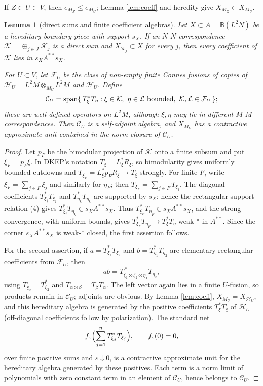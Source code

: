\documentclass[12pt]{article}
\newtheorem{lemma}{Lemma}
\newcommand{\cH}{\mathcal H}
\newcommand{\cK}{\mathcal K}
\newcommand{\cL}{\mathcal L}
\newcommand{\cF}{\mathcal F}
\begin{document}
If \(Z\subset U\subset V\), then \(e_{M_Z}\le e_{M_U}\); Lemma
\ref{lem:coeff} and heredity give \(X_{M_Z}\subset X_{M_U}\).

\begin{lemma}[direct sums and finite coefficient algebras]\label{lem:dsupport}
Let \(X\subset A=\mathbb B(L^2N)\) be a hereditary boundary piece with support
\(s_X\).  If an \(N\)-\(N\) correspondence \(\cK=\oplus_{j\in J}\cK_j\) is a
direct sum and \(X_{\cK_j}\subset X\) for every \(j\), then every coefficient of
\(\cK\) lies in \(s_XA^{**}s_X\).

For \(U\subset V\), let \(\cF_U\) be the class of non-empty finite Connes
fusions of copies of
\(\cH_U=L^2M\otimes_{M_U}L^2M\) and \(\overline{\cH_U}\).  Define
\[
 \mathcal C_U=\operatorname{span}\{\,T_\xi^*T_\eta:
       \xi\in\cK,\ \eta\in\cL \hbox{ bounded},\ \cK,\cL\in\cF_U\,\};
\]
these are well-defined operators on \(L^2M\), although \(\xi,\eta\) may lie in
different \(M\)-\(M\) correspondences.  Then \(\mathcal C_U\) is a self-adjoint
algebra, and \(X_{M_U}\) has a contractive approximate unit contained in the
norm closure of \(\mathcal C_U\).
\end{lemma}

\begin{proof}
Let \(p_F\) be the bimodular projection of \(\cK\) onto a finite subsum and put
\(\xi_F=p_F\xi\).  In DKEP's notation \(T_\xi=L_\xi^*R_\xi\), so bimodularity
gives uniformly bounded cutdowns and
\(T_{\xi_F}=L_\xi^*p_FR_\xi\to T_\xi\) strongly.  For finite \(F\), write
\(\xi_F=\sum_{j\in F}\xi_j\) and similarly for \(\eta_F\); then
\(T_{\xi_F}=\sum_{j\in F}T_{\xi_j}\).  The diagonal coefficients
\(T_{\xi_j}^*T_{\xi_j}\) and
\(T_{\eta_k}^*T_{\eta_k}\) are supported by \(s_X\); hence the rectangular
support relation (4) gives \(T_{\xi_j}^*T_{\eta_k}\in s_XA^{**}s_X\).  Thus
\(T_{\xi_F}^*T_{\eta_F}\in s_XA^{**}s_X\), and the strong convergence, with uniform bounds, gives
\(T_{\xi_F}^*T_{\eta_F}\to T_\xi^*T_\eta\) weak-* in \(A^{**}\).  Since the corner
\(s_XA^{**}s_X\) is weak-* closed, the first assertion follows.

For the second assertion, if
\(a=T_{\xi_1}^*T_{\xi_2}\) and \(b=T_{\eta_1}^*T_{\eta_2}\) are elementary
rectangular coefficients from \(\cF_U\), then
\[
 ab=T_{\xi_1\otimes\overline{\xi_2}\otimes\eta_1}^{\,*}T_{\eta_2},
\]
using \(T_{\overline{\xi_2}}=T_{\xi_2}^*\) and
\(T_{\alpha\otimes\beta}=T_\beta T_\alpha\).  The left vector again lies in a
finite \(U\)-fusion, so products remain in \(\mathcal C_U\); adjoints are
obvious.  By Lemma \ref{lem:coeff}, \(X_{M_U}=X_{\cH_U}\), and this hereditary
algebra is generated by the positive coefficients \(T_\xi^*T_\xi\) of
\(\cH_U\) (off-diagonal coefficients follow by polarization).  The standard
net
\[
 f_\varepsilon\Bigl(\sum_{j=1}^n T_{\xi_j}^*T_{\xi_j}\Bigr),
        \qquad f_\varepsilon(0)=0,
\]
over finite positive sums and \(\varepsilon\downarrow0\), is a contractive
approximate unit for the hereditary algebra generated by these positives.  Each
term is a norm limit of polynomials with zero constant term in an element of
\(\mathcal C_U\), hence belongs to \(\overline{\mathcal C_U}\).
\end{proof}
\end{document}
